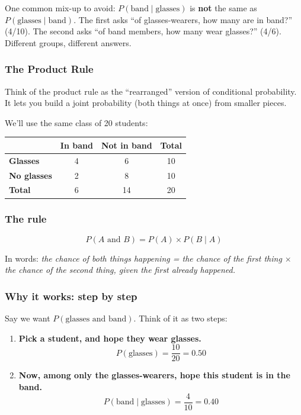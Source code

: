 One common mix-up to avoid: $P(\text{band} \mid \text{glasses})$ is \textbf{not} the same as $P(\text{glasses} \mid \text{band})$. The first asks ``of glasses-wearers, how many are in band?'' (4/10). The second asks ``of band members, how many wear glasses?'' (4/6). Different groups, different answers.

\subsubsection*{The Product Rule}

Think of the product rule as the ``rearranged'' version of conditional probability. It lets you build a joint probability (both things at once) from smaller pieces.

We'll use the same class of 20 students:

\begin{center}
\begin{tabular}{lccc}
\toprule
 & In band & Not in band & Total \\
\midrule
\textbf{Glasses} & 4 & 6 & 10 \\
\textbf{No glasses} & 2 & 8 & 10 \\
\midrule
\textbf{Total} & 6 & 14 & 20 \\
\bottomrule
\end{tabular}
\end{center}

\subsubsection*{The rule}

\[
P(A \text{ and } B) = P(A) \times P(B \mid A)
\]

In words: \emph{the chance of both things happening = the chance of the first thing $\times$ the chance of the second thing, given the first already happened.}

\subsubsection*{Why it works: step by step}

Say we want $P(\text{glasses and band})$. Think of it as two steps:

\begin{enumerate}
\item \textbf{Pick a student, and hope they wear glasses.}
\[
P(\text{glasses}) = \frac{10}{20} = 0.50
\]
\item \textbf{Now, among only the glasses-wearers, hope this student is in the band.}
\[
P(\text{band} \mid \text{glasses}) = \frac{4}{10} = 0.40
\]
\end{enumerate}

